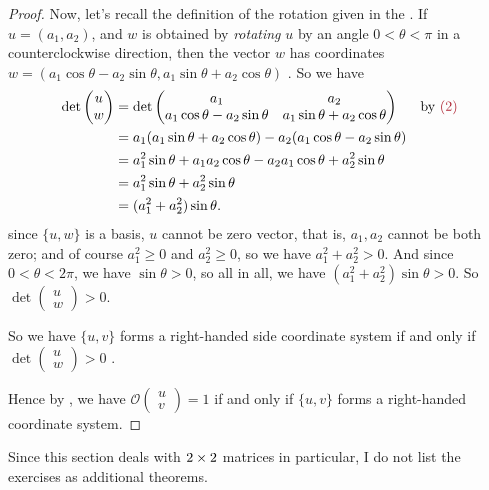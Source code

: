 \begin{proof}
Now, let's recall the definition of the rotation given in the .
If \(u = (a_1, a_2)\), and \(w\) is obtained by \emph{rotating} \(u\) by an angle \(0 < \theta < \pi\) in a counterclockwise direction,
then the vector \(w\) has coordinates \(w = (a_1 \cos \theta -  a_2 \sin \theta, a_1 \sin \theta + a_2 \cos \theta )\) .
So we have
\begin{align*}
    \det \begin{pmatrix} u \\ w \end{pmatrix}
        & = \det
            \begin{pmatrix}
                a_1 & a_2 \\
                a_1 \cos \theta - a_2 \sin \theta & a_1 \sin \theta + a_2 \cos \theta
            \end{pmatrix} & \text{by \MAROON{(2)}} \\
        & = a_1(a_1 \sin \theta + a_2 \cos \theta) - a_2(a_1 \cos \theta - a_2 \sin \theta) \\
        & = a_1^2 \sin \theta + a_1 a_2 \cos \theta - a_2 a_1 \cos \theta + a_2^2 \sin \theta \\
        & = a_1^2 \sin \theta + a_2^2 \sin \theta \\
        & = (a_1^2 + a_2^2) \sin \theta.
\end{align*}
since \(\{ u, w \}\) is a basis, \(u\) cannot be zero vector, that is, \(a_1, a_2\) cannot be both zero;
and of course \(a_1^2 \ge 0\) and \(a_2^2 \ge 0\), so we have \(a_1^2 + a_2^2 > 0\).
And since \(0 < \theta < 2\pi\), we have \(\sin \theta > 0\), so all in all, we have \((a_1^2 + a_2^2) \sin \theta > 0\).
So \(\det \begin{pmatrix} u \\ w \end{pmatrix} > 0\).

So we have \(\{ u, v \}\) forms a right-handed side coordinate system if and only if \(\det \begin{pmatrix} u \\ w \end{pmatrix} > 0\) .

Hence by , we have \(\mathcal{O} \begin{pmatrix} u \\ v \end{pmatrix} = 1\) if and only if \(\{ u, v \}\) forms a right-handed coordinate system.
\end{proof}

\begin{remark} \label{remark 4.1.5}
Since this section deals with \(2 \times 2\) matrices in particular, I do not list the exercises as additional theorems.
\end{remark}